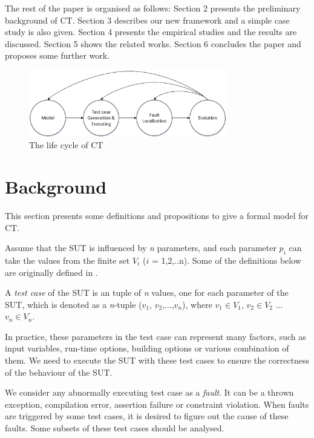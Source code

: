\documentclass{sig-alternate}
\begin{document}
The rest of the paper is organised as follows: Section 2 presents the preliminary background of CT.  Section 3 describes our new framework and a simple case study is also given. Section 4 presents the empirical studies and the results are discussed. Section 5 shows the related works. Section 6 concludes the paper and proposes some further work.


\begin{figure}
 \includegraphics[width=3.4in]{CT_lifecircle.eps}
\caption{The life cycle of CT}
\label{ct-life}
\end{figure}




\section{Background}
This section presents some definitions and propositions to give a formal model for CT.


Assume that the SUT is influenced by \emph{n} parameters, and each parameter $p_{i}$ can take the values from the finite set $V_{i}$ ($i$ = 1,2,..n). Some of the definitions below are originally defined in \cite{nie2011minimal}.

\begin{definition}
A \emph{test case} of the SUT is an tuple of \emph{n} values, one for each parameter of the SUT, which is denoted as a \emph{n}-tuple ($v_{1}$, $v_{2}$,...,$v_{n}$), where $v_{1}\in V_{1}$, $v_{2} \in V_{2}$ ... $v_{n} \in V_{n}$.
\end{definition}

In practice, these parameters in the test case can represent many factors, such as input variables, run-time options, building options or various combination of them. We need to execute the SUT with these test cases to ensure the correctness of the behaviour of the SUT.

We consider any abnormally executing test case as a \emph{fault}. It can be a thrown exception, compilation error, assertion failure or constraint violation. When faults are triggered by some test cases, it is desired to figure out the cause of these faults. Some subsets of these test cases should be analysed.
\end{document}
